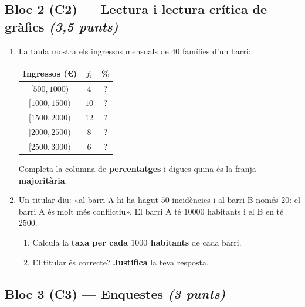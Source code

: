 \subsection*{Bloc 2 (C2) — Lectura i lectura crítica de gràfics \hfill \normalfont\itshape (3,5 punts)}

\begin{enumerate}[label=\textbf{\arabic*.}, leftmargin=2em, itemsep=8pt, start=3]
  \item La taula mostra els ingressos mensuals de $40$ famílies d'un barri:
    \begin{center}
    \begin{tabular}{c c c}
    \toprule
    \textbf{Ingressos (\euro)} & $f_i$ & \textbf{\%} \\
    \midrule
    $[500,1000)$ & $4$ & ? \\
    $[1000,1500)$ & $10$ & ? \\
    $[1500,2000)$ & $12$ & ? \\
    $[2000,2500)$ & $8$ & ? \\
    $[2500,3000)$ & $6$ & ? \\
    \bottomrule
    \end{tabular}
    \end{center}
    Completa la columna de \textbf{percentatges} i digues quina és la franja
    \textbf{majoritària}.
  \item Un titular diu: «al barri A hi ha hagut $50$ incidències i al barri B només
        $20$: el barri A és molt més conflictiu». El barri A té $\num{10000}$ habitants
        i el B en té $\num{2500}$.
    \begin{enumerate}[label=\alph*), leftmargin=1.6em, topsep=2pt]
      \item Calcula la \textbf{taxa per cada $\num{1000}$ habitants} de cada barri.
      \item El titular és correcte? \textbf{Justifica} la teva resposta.
    \end{enumerate}
\end{enumerate}

\subsection*{Bloc 3 (C3) — Enquestes \hfill \normalfont\itshape (3 punts)}

